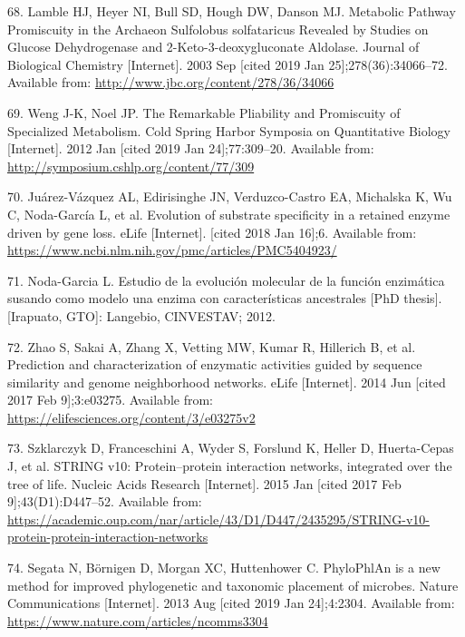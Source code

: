 \documentclass[12pt,twoside]{reedthesis}
\begin{document}
{  \hypertarget{ref-lamble_archaea_promiscuou_pathways_2003}{}
  68. Lamble HJ, Heyer NI, Bull SD, Hough DW, Danson MJ. Metabolic Pathway
  Promiscuity in the Archaeon Sulfolobus solfataricus Revealed by Studies
  on Glucose Dehydrogenase and 2-Keto-3-deoxygluconate Aldolase. Journal
  of Biological Chemistry {[}Internet{]}. 2003 Sep {[}cited 2019 Jan
  25{]};278(36):34066--72. Available from:
  \url{http://www.jbc.org/content/278/36/34066}
  
  \hypertarget{ref-weng_promiscuity_specialized_pathways_2012}{}
  69. Weng J-K, Noel JP. The Remarkable Pliability and Promiscuity of
  Specialized Metabolism. Cold Spring Harbor Symposia on Quantitative
  Biology {[}Internet{]}. 2012 Jan {[}cited 2019 Jan 24{]};77:309--20.
  Available from: \url{http://symposium.cshlp.org/content/77/309}
  
  \hypertarget{ref-juarez-vazquez_evolution_2017}{}
  70. Juárez-Vázquez AL, Edirisinghe JN, Verduzco-Castro EA, Michalska K,
  Wu C, Noda-García L, et al. Evolution of substrate specificity in a
  retained enzyme driven by gene loss. eLife {[}Internet{]}. {[}cited 2018
  Jan 16{]};6. Available from:
  \url{https://www.ncbi.nlm.nih.gov/pmc/articles/PMC5404923/}
  
  \hypertarget{ref-noda_tesis_2012}{}
  71. Noda-Garcia L. Estudio de la evolución molecular de la función
  enzimática susando como modelo una enzima con características
  ancestrales {[}PhD thesis{]}. {[}Irapuato, GTO{]}: Langebio, CINVESTAV;
  2012.
  
  \hypertarget{ref-zhao__function_prediction_neighbourhood_2014}{}
  72. Zhao S, Sakai A, Zhang X, Vetting MW, Kumar R, Hillerich B, et al.
  Prediction and characterization of enzymatic activities guided by
  sequence similarity and genome neighborhood networks. eLife
  {[}Internet{]}. 2014 Jun {[}cited 2017 Feb 9{]};3:e03275. Available
  from: \url{https://elifesciences.org/content/3/e03275v2}
  
  \hypertarget{ref-szklarczyk_string_2015}{}
  73. Szklarczyk D, Franceschini A, Wyder S, Forslund K, Heller D,
  Huerta-Cepas J, et al. STRING v10: Protein--protein interaction
  networks, integrated over the tree of life. Nucleic Acids Research
  {[}Internet{]}. 2015 Jan {[}cited 2017 Feb 9{]};43(D1):D447--52.
  Available from:
  \url{https://academic.oup.com/nar/article/43/D1/D447/2435295/STRING-v10-protein-protein-interaction-networks}
  
  \hypertarget{ref-segata_phylophlan_2013}{}
  74. Segata N, Börnigen D, Morgan XC, Huttenhower C. PhyloPhlAn is a new
  method for improved phylogenetic and taxonomic placement of microbes.
  Nature Communications {[}Internet{]}. 2013 Aug {[}cited 2019 Jan
  24{]};4:2304. Available from:
  \url{https://www.nature.com/articles/ncomms3304}
  
}
\end{document}
